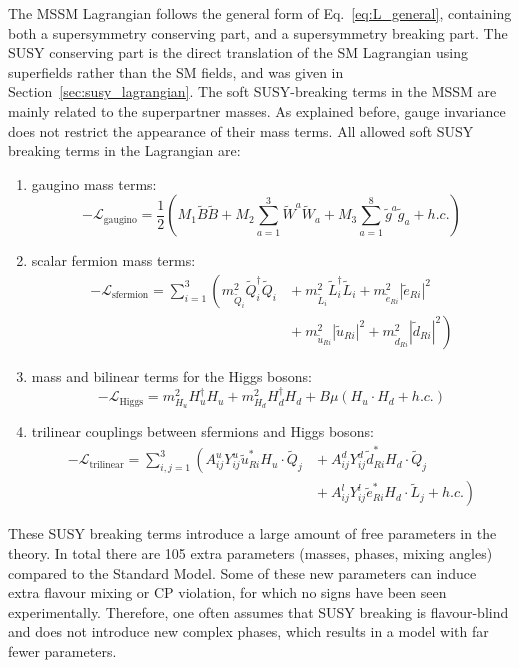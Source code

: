 The MSSM Lagrangian follows the general form of Eq.~\ref{eq:L_general}, containing both a
supersymmetry conserving part, and a supersymmetry breaking part. 
The SUSY conserving part is the direct translation of the SM Lagrangian using superfields rather
than the SM fields, and was given in Section~\ref{sec:susy_lagrangian}.  
The soft SUSY-breaking terms in the MSSM are mainly related to the superpartner masses. As
explained before, gauge invariance does not restrict the appearance of their mass terms. 
All allowed soft SUSY breaking terms in the Lagrangian are:
\begin{enumerate}
  \item gaugino mass terms: 
    \begin{equation}
      - \mathcal{L}_{\text{gaugino}} = \frac{1}{2} \left( M_1\widetilde{B}\widetilde{B} + M_2
\sum_{a=1}^3 \widetilde{W}^a\widetilde{W}_a + M_3 \sum_{a=1}^8 \widetilde{g}^a\widetilde{g}_a + h.c.
\right)
    \end{equation}
  \item scalar fermion mass terms:
    \begin{align}
      - \mathcal{L}_{\text{sfermion}} = \sum_{i=1}^3 \left( 
m_{\widetilde{Q}_i}^2\widetilde{Q}^\dagger_i\widetilde{Q}_i \right.
&{}+ m_{\widetilde{L}_i}^2\widetilde{L}^\dagger_i\widetilde{L}_i +
m_{\widetilde{e}_{Ri}}^2 \left|\widetilde{e}_{Ri}\right|^2  
 \nonumber \\
 &{}+ \left. m_{\widetilde{u}_{Ri}}^2\left|\widetilde{u}_{Ri}\right|^2 +
m_{\widetilde{d}_{Ri}}^2 \left|\widetilde{d}_{Ri}\right|^2
\right)
\end{align}
  \item mass and bilinear terms for the Higgs bosons:
    \begin{equation}
      - \mathcal{L}_{\text{Higgs}} = m^2_{H_u} H_u^\dagger H_u + m^2_{H_d} H_d^\dagger H_d + B\mu
(H_u \cdot H_d + h.c.)
      \label{eq:L_higgs}
    \end{equation}
  \item trilinear couplings between sfermions and Higgs bosons:
    \begin{align}
       - \mathcal{L}_{\text{trilinear}} = \sum_{i,j=1}^3 \left( A_{ij}^u Y_{ij}^u
\widetilde{u}_{Ri}^* H_u \cdot \widetilde{Q}_j \right. &{}+ A_{ij}^d Y_{ij}^d \widetilde{d}_{Ri}^*
H_d \cdot \widetilde{Q}_j \nonumber \\
&{}+ \left. A_{ij}^l Y_{ij}^l \widetilde{e}_{Ri}^* H_d \cdot \widetilde{L}_j + h.c. \right)
    \end{align}

\end{enumerate}
These SUSY breaking terms introduce a large amount of free parameters in the theory. In total there
are 105 extra parameters (masses, phases, mixing angles) compared to the Standard Model. 
Some of these new parameters can induce extra flavour mixing or CP violation, for which no signs
have been seen experimentally. Therefore, one often assumes that SUSY breaking is flavour-blind
and does not introduce new complex phases, which results in a model with far fewer parameters. 

